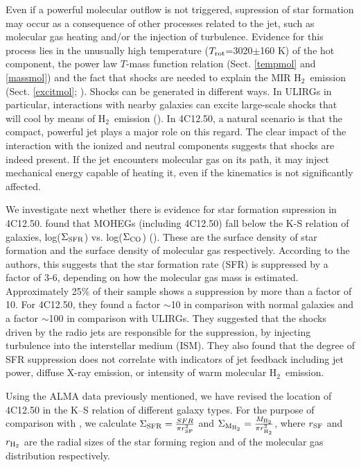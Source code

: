 \documentclass{aa}
\newcommand{\hmol}{H$_2$~}
\begin{document}
Even if a powerful molecular outflow is not triggered, supression of star formation may  occur as a consequence of other processes related to the jet,    such as  molecular gas heating and/or the injection of turbulence. Evidence for this process  lies in the  unusually high temperature ($T_{\rm rot}$=3020$\pm$160 K) of the hot component, the power law $T$-mass function relation  (Sect. \ref{tempmol} and \ref{massmol}) and the fact that shocks are needed to explain the MIR \hmol emission (Sect. \ref{excitmol}; \citealt{Ogle2010,Guillard2012}).  Shocks can be generated in different ways. In ULIRGs in particular, interactions with nearby galaxies can excite large-scale shocks that will cool by means of \hmol emission (\citealt{Zakamska2010,Rich2015}).   In 4C12.50,  a natural scenario is that the  compact, powerful jet plays a major role on this regard.    The clear impact   of the interaction with the ionized and neutral components suggests that shocks are indeed present. If the jet encounters molecular gas on its path, it may  inject mechanical energy capable of heating it, even if the kinematics is not significantly affected. 

We investigate next whether there is evidence for star formation supression in 4C12.50.
\cite{Lanz2016} found that MOHEGs  (including 4C12.50) fall below the K-S relation of galaxies, log($\Sigma_{\rm SFR}$) vs. log($\Sigma_{\rm CO}$) (\citealt{Kennicutt1998}). These are the surface density of star formation  and   the surface density of molecular gas respectively. According to the authors, this suggests that   the star formation rate (SFR) is suppressed by a factor of 3-6, depending on how the molecular gas mass is estimated. Approximately 25\% of their sample shows  a suppression by more than a factor of 10. For 4C12.50, they found a factor  $\sim$10 in comparison with normal galaxies and a factor $\sim$100  in comparison with ULIRGs.  They suggested that  the shocks driven by the radio jets are responsible for the suppression, by injecting turbulence into the interstellar medium
(ISM).  They also found that the degree of SFR suppression does not correlate with indicators of jet feedback including jet power, diffuse X-ray emission, or intensity of warm molecular \hmol emission.




Using the ALMA data  previously mentioned, we have revised the location of 4C12.50 in the K–S relation   of different galaxy types. For the purpose of comparison with \cite{Lanz2016}, we  calculate $\Sigma_{\rm SFR}=\frac{SFR}{\pi r_{\rm SF}^2}$ and    $\Sigma_{\rm M_{\rm H_2}}=\frac{M_{\rm H_2}}{\pi r_{\rm H_2}^2}$,  where $r_{\rm SF}$ and $r_{\rm H_2}$ are the radial sizes  of the star forming region and of the molecular gas distribution respectively. 
\end{document}
